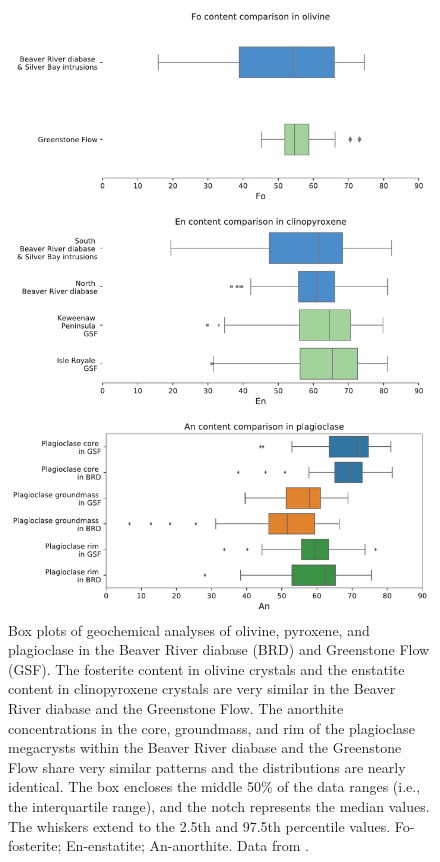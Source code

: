 \documentclass[draft]{agujournal2019}
\begin{document}
\begin{figure}
\centering
\noindent\includegraphics[width=5 in]{Geochem.pdf}
\caption{\footnotesize{Box plots of geochemical analyses of olivine, pyroxene, and plagioclase in the Beaver River diabase (BRD) and Greenstone Flow (GSF). The fosterite content in olivine crystals and the enstatite content in clinopyroxene crystals are very similar in the Beaver River diabase and the Greenstone Flow. The anorthite concentrations in the core, groundmass, and rim of the plagioclase megacrysts within the Beaver River diabase and the Greenstone Flow share very similar patterns and the distributions are nearly identical. The box encloses the middle 50\% of the data ranges (i.e., the interquartile range), and the notch represents the median values. The whiskers extend to the 2.5th and 97.5th percentile values. Fo-fosterite; En-enstatite; An-anorthite. Data from .}}
\label{fig:Geochem}
\end{figure}
\end{document}

